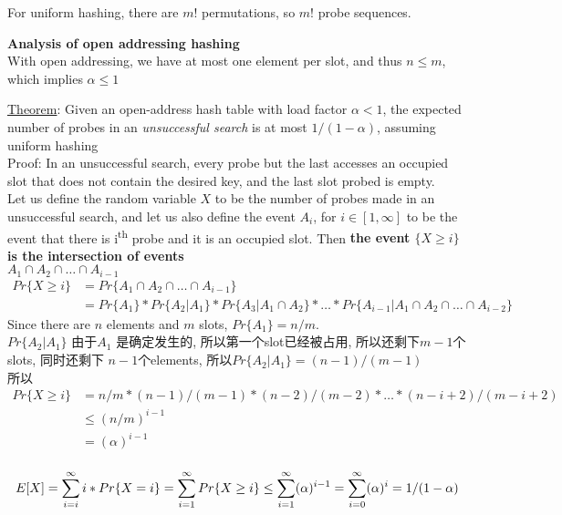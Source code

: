 \documentclass{article}
\begin{document}
For uniform hashing, there are $m!$ permutations, so $m!$ probe sequences.

\textbf{Analysis of open addressing hashing}\\
With open addressing, we have at most one element per slot, and thus $n \leq m$, which implies $\alpha \leq 1$

\underline{Theorem}: Given an open-address hash table with load factor $\alpha < 1$, the expected number of probes in an \textit{unsuccessful search} is at most $1/(1-\alpha)$, assuming uniform hashing\\
Proof: In an unsuccessful search, every probe but the last accesses an occupied slot that does not contain the desired key, and the last slot probed is empty.\\
Let us define the random variable $X$ to be the number of probes made in an unsuccessful search, and let us also define the event $A_i$, for $i \in [1,\infty]$ to be the event that there is i\textsuperscript{th} probe and it is an occupied slot. Then \textbf{the event $\{X \geq i\}$ is the intersection of events} \\
$A_1 \cap A_2 \cap \ldots \cap A_{i-1}$\\
$$
\begin{aligned}
Pr\{X \geq i\} & =Pr\{A_1 \cap A_2 \cap \ldots \cap A_{i-1}\} \\
	&= Pr\{A_1\} * Pr\{A_2 | A_1\} * Pr\{A_3 | A_1 \cap A_2\} *\ldots* Pr\{A_{i-1} | A_1 \cap A_2 \cap \ldots \cap A_{i-2}\}
\end{aligned}
$$
Since there are $n$ elements and $m$ slots, $Pr\{A_1\}=n/m$.\\
$Pr\{A_2 | A_1\}$ 由于$A_1$ 是确定发生的, 所以第一个slot已经被占用, 所以还剩下$m-1$个slots, 同时还剩下 $n-1$个elements, 所以$Pr\{A_2 | A_1\}=(n-1)/(m-1)$\\
所以
$$
\begin{aligned}
Pr\{X \geq i\}
&=n/m * (n-1)/(m-1) * (n-2)/(m-2) *\ldots* (n-i+2)/(m-i+2)\\
&\leq (n/m)^{i-1}\\
&=(\alpha)^{i-1}\\
\end{aligned}
$$

$$
E[X]
=\sum_{i=i}^{\infty} i*Pr\{X=i\}\\
=\sum_{i=1}^{\infty} Pr\{X \geq i\}\\
\leq \sum_{i=1}^{\infty} (\alpha)^{i-1}\\
= \sum_{i=0}^{\infty} (\alpha)^i\\
=1/(1 - \alpha)
$$
\end{document}
